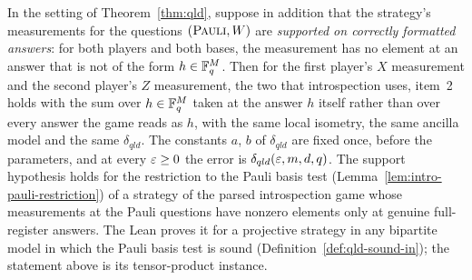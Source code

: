 \begin{corollary}
\label{cor:qld-valid}
\leanok
In the setting of Theorem~\ref{thm:qld}, suppose in addition that the strategy's measurements for
the questions $(\textsc{Pauli}, W)$ are \emph{supported on correctly formatted answers}: for both players
and both bases, the measurement has no element at an answer that is not of the form
$h \in \mathbb{F}_q^M$. Then for the first player's $X$ measurement and the second player's $Z$
measurement, the two that introspection uses, item~2 holds with the sum over $h \in \mathbb{F}_q^M$ taken
at the answer $h$ itself rather than over every answer the game reads as $h$, with the same local
isometry, the same ancilla model and the same $\delta_{qld}$. The constants $a$, $b$ of
$\delta_{qld}$ are fixed once, before the parameters, and at every $\varepsilon \geq 0$ the error is
$\delta_{qld}(\varepsilon, m, d, q)$. The support hypothesis holds for the restriction to the Pauli basis
test (Lemma~\ref{lem:intro-pauli-restriction}) of a strategy of the parsed introspection game whose
measurements at the Pauli questions have nonzero elements only at genuine full-register answers.
The Lean proves it for a projective strategy in any bipartite model in which the Pauli basis test
is sound (Definition~\ref{def:qld-sound-in}); the statement above is its tensor-product instance.
\end{corollary}

